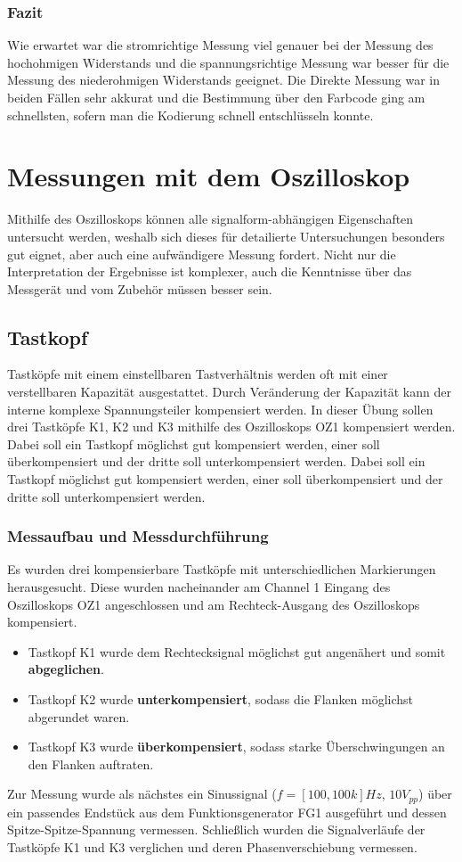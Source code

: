 \documentclass[a4paper]{article}
\begin{document}
\subsubsection*{Fazit}
Wie erwartet war die stromrichtige Messung viel genauer bei der Messung des
hochohmigen Widerstands und die spannungsrichtige Messung war besser für die
Messung des niederohmigen Widerstands geeignet. Die Direkte Messung war in
beiden Fällen sehr akkurat und die Bestimmung über den Farbcode ging am
schnellsten, sofern man die Kodierung schnell entschlüsseln konnte.

\newpage
\section{Messungen mit dem Oszilloskop}
Mithilfe des Oszilloskops können alle signalform-abhängigen Eigenschaften
untersucht werden, weshalb sich dieses für detailierte Untersuchungen besonders
gut eignet, aber auch eine aufwändigere Messung fordert. Nicht nur die
Interpretation der Ergebnisse ist komplexer, auch die Kenntnisse über das
Messgerät und vom Zubehör müssen besser sein.

\subsection{Tastkopf}
Tastköpfe mit einem einstellbaren Tastverhältnis werden oft mit einer verstellbaren
Kapazität ausgestattet. Durch Veränderung der Kapazität kann der interne
komplexe Spannungsteiler kompensiert werden. In dieser Übung sollen drei Tastköpfe
K1, K2 und K3 mithilfe des Oszilloskops OZ1 kompensiert werden. Dabei soll ein
Tastkopf möglichst gut kompensiert werden, einer soll überkompensiert und der dritte
soll unterkompensiert werden. Dabei soll ein
Tastkopf möglichst gut kompensiert werden, einer soll überkompensiert und der dritte
soll unterkompensiert werden.

\subsubsection{Messaufbau und Messdurchführung}
Es wurden drei kompensierbare Tastköpfe mit unterschiedlichen Markierungen herausgesucht.
Diese wurden nacheinander am Channel 1 Eingang des Oszilloskops OZ1 angeschlossen
und am Rechteck-Ausgang des Oszilloskops kompensiert. 
\begin{itemize}
    \item Tastkopf K1 wurde dem Rechtecksignal möglichst gut angenähert und 
        somit \textbf{abgeglichen}.
    \item Tastkopf K2 wurde \textbf{unterkompensiert}, sodass die Flanken möglichst
        abgerundet waren.
    \item Tastkopf K3 wurde \textbf{überkompensiert}, sodass starke Überschwingungen an
        den Flanken auftraten.
\end{itemize}
Zur Messung wurde als nächstes ein Sinussignal ($f=[100, 100\unit{k}]\unit{Hz}$,
$10\unit{V_{pp}}$) über ein passendes Endstück aus dem Funktionsgenerator FG1
ausgeführt und dessen Spitze-Spitze-Spannung vermessen. Schließlich wurden die
Signalverläufe der Tastköpfe K1 und K3 verglichen und deren Phasenverschiebung vermessen.
\end{document}
